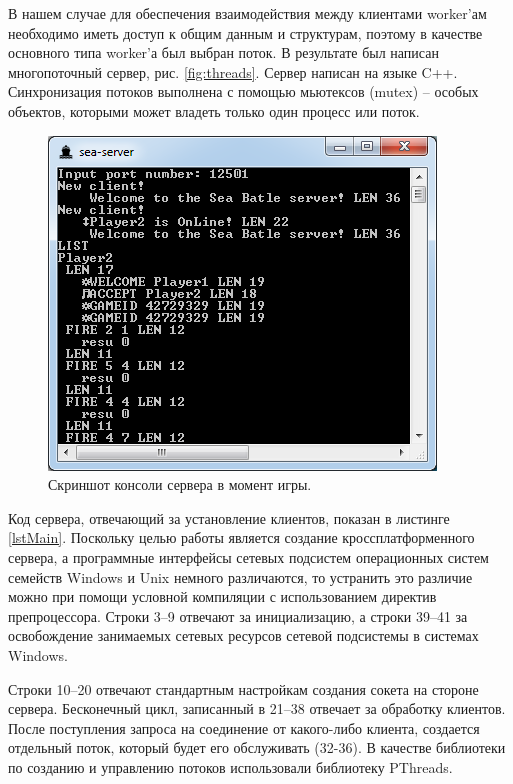 \documentclass[12pt, a4paper, oneside]{article}
\begin{document}
В нашем случае для обеспечения взаимодействия между клиентами worker’ам необходимо иметь доступ к общим данным и структурам,  поэтому в качестве основного типа worker’а был выбран поток. В результате был написан многопоточный сервер, рис. \ref{fig:threads}. Сервер написан на языке C++. Синхронизация потоков выполнена с помощью мьютексов (mutex) – особых объектов, которыми может владеть только один процесс или поток.
\begin{figure}[b!]
\begin{center}
	\includegraphics[scale=0.6]{server.png}
	\vspace{-.1cm}
	\caption{Скриншот консоли сервера в момент игры.}
	\label{fig:server}
        \vspace{-.8cm}
\end{center}
\end{figure}

Код сервера, отвечающий за установление клиентов, показан в листинге \ref{lstMain}. Поскольку целью работы является создание кроссплатформенного сервера, а программные интерфейсы сетевых подсистем операционных систем семейств Windows и Unix немного различаются, то устранить это различие можно при помощи условной компиляции с использованием директив препроцессора. Строки 3--9 отвечают за инициализацию, а строки 39--41 за освобождение занимаемых сетевых ресурсов сетевой подсистемы в системах Windows. 

Строки 10--20 отвечают стандартным настройкам создания сокета на стороне сервера. Бесконечный цикл, записанный в 21--38 отвечает за обработку клиентов. После поступления запроса на соединение от какого-либо клиента, создается отдельный поток, который будет его обслуживать (32-36). В качестве библиотеки по созданию и управлению потоков использовали библиотеку PThreads.
\end{document}
